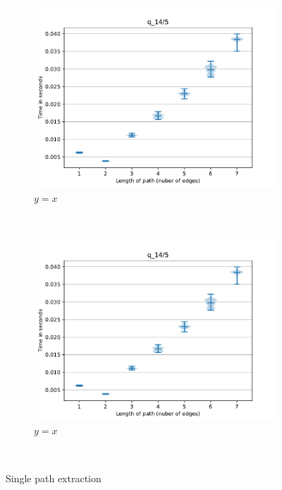 \begin{figure}
     \begin{subfigure}[b]{0.24\textwidth}
         \centering
         \includegraphics[width=\textwidth]{data/res_graphics/q_14_5.pdf}
         \caption{$y=x$}
         \label{fig:y equals x}
     \end{subfigure}
     ~\begin{subfigure}[b]{0.24\textwidth}
         \centering
         \includegraphics[width=\textwidth]{data/res_graphics/q_14_5.pdf}
         \caption{$y=x$}
         \label{fig:y equals x}
     \end{subfigure}\\
   \caption{Single path extraction}
\end{figure}


